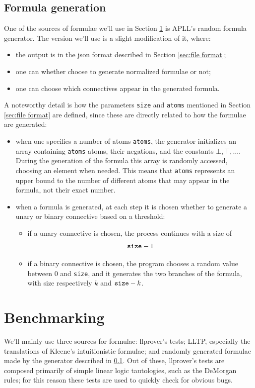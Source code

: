 \subsection{Formula generation}\label{sec:formula generator}
One of the sources of formulae we'll use in Section \ref{sec:benchmarking} is APLL's random formula generator.
The version we'll use is a slight modification of it, where:
\begin{itemize}
	\item the output is in the json format described in Section \ref{sec:file format};
	\item one can whether choose to generate normalized formulae or not;
	\item one can choose which connectives appear in the generated formula.
\end{itemize}
A noteworthy detail is how the parameters \texttt{size} and \texttt{atoms} mentioned in Section \ref{sec:file format} are defined, since these are directly related to how the formulae are generated:
\begin{itemize}
	\item when one specifies a number of atoms \texttt{atoms}, the generator initializes an array containing \texttt{atoms} atoms, their negations, and the constants $\bot, \top, \dots$.
		During the generation of the formula this array is randomly accessed, choosing an element when needed.
		This means that \texttt{atoms} represents an upper bound to the number of different atoms that may appear in the formula, not their exact number.
	\item when a formula is generated, at each step it is chosen whether to generate a unary or binary connective based on a threshold:
		\begin{itemize}
			\item if a unary connective is chosen, the process continues with a size of 
				$$\text{\texttt{size}} - 1$$
			\item if a binary connective is chosen, the program chooses a random value between 0 and \texttt{size}, and it generates the two branches of the formula, with size respectively $k$ and $\text{\texttt{size}} - k$.
		\end{itemize}
\end{itemize}

\section{Benchmarking}\label{sec:benchmarking}
We'll mainly use three sources for formulae: llprover's tests; LLTP, especially the translations of Kleene's intuitionistic formulae; and randomly generated formulae made by the generator described in \ref{sec:formula generator}.
Out of these, llprover's tests are composed primarily of simple linear logic tautologies, such as the DeMorgan rules; for this reason these tests are used to quickly check for obvious bugs.

